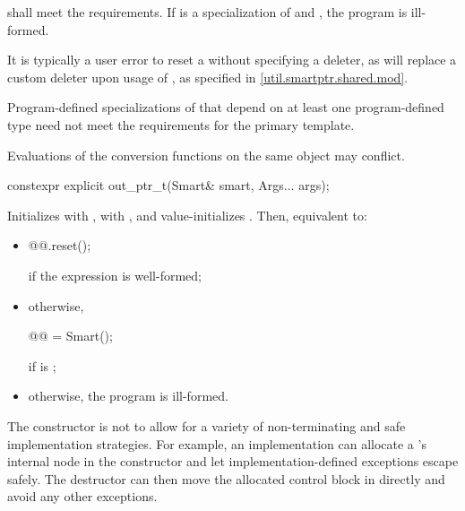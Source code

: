 \pnum
{} shall meet the  requirements.
If  is a specialization of  and
,
the program is ill-formed.
\begin{note}
It is typically a user error to reset a 
without specifying a deleter,
as  will replace a custom deleter upon usage of ,
as specified in \ref{util.smartptr.shared.mod}.
\end{note}

\pnum
Program-defined specializations of 
that depend on at least one program-defined type
need not meet the requirements for the primary template.

\pnum
Evaluations of the conversion functions
on the same object may conflict.

%
\begin{itemdecl}
constexpr explicit out_ptr_t(Smart& smart, Args... args);
\end{itemdecl}

\begin{itemdescr}
\pnum
\effects
Initializes  with ,
 with , and
value-initializes .
Then, equivalent to:
\begin{itemize}
\item
\mbox{}\vspace{-\baselineskip}\vspace{-\parskip}
\begin{codeblock}
@@.reset();
\end{codeblock}
if the expression  is well-formed;

\item
otherwise,
\begin{codeblock}
@@ = Smart();
\end{codeblock}
if  is ;

\item
otherwise, the program is ill-formed.
\end{itemize}

\pnum
\begin{note}
The constructor is not 
to allow for a variety of non-terminating and safe implementation strategies.
For example, an implementation can allocate
a 's internal node in the constructor and
let implementation-defined exceptions escape safely.
The destructor can then move the allocated control block in directly and
avoid any other exceptions.
\end{note}
\end{itemdescr}

